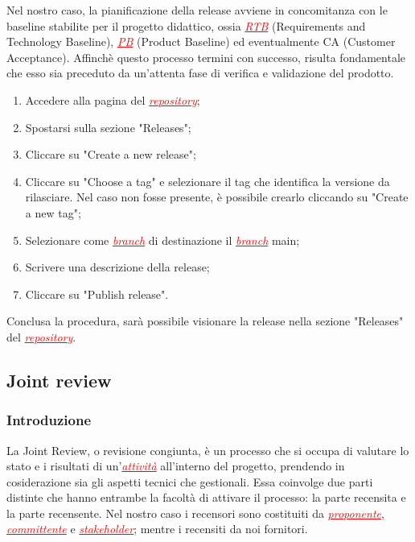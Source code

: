 Nel nostro caso, la pianificazione della release avviene in concomitanza con le baseline stabilite per il progetto didattico, ossia 
\textcolor{red}{\uline{\textit{RTB}}} (Requirements and Technology Baseline), 
\textcolor{red}{\uline{\textit{PB}}} (Product Baseline) ed eventualmente CA (Customer Acceptance).
Affinchè questo processo termini con successo, risulta fondamentale che esso sia preceduto da un'attenta fase di verifica e validazione del prodotto.

\begin{enumerate}
    \item Accedere alla pagina del \textcolor{red}{\uline{\textit{repository}}};
    \item Spostarsi sulla sezione "Releases";
    \item Cliccare su "Create a new release";
    \item Cliccare su "Choose a tag" e selezionare il tag che identifica la versione da rilasciare. Nel caso non fosse presente, è possibile
    crearlo cliccando su "Create a new tag";
    \item Selezionare come \textcolor{red}{\uline{\textit{branch}}} di destinazione il \textcolor{red}{\uline{\textit{branch}}} main;
    \item Scrivere una descrizione della release;
    \item Cliccare su "Publish release".
\end{enumerate}
Conclusa la procedura, sarà possibile visionare la release nella sezione "Releases" del \textcolor{red}{\uline{\textit{repository}}}.

\subsection{Joint review}
\subsubsection{Introduzione}
La Joint Review, o revisione congiunta, è un processo che si occupa di valutare lo stato e i risultati di un'\textcolor{red}{\uline{\textit{attività}}}
all'interno del progetto, prendendo in cosiderazione sia gli aspetti tecnici che gestionali. Essa coinvolge due parti distinte che hanno entrambe
la facoltà di attivare il processo: la parte recensita e la parte recensente. Nel nostro caso i recensori sono costituiti da
\textcolor{red}{\uline{\textit{proponente}}}, \textcolor{red}{\uline{\textit{committente}}} e \textcolor{red}{\uline{\textit{stakeholder}}};
mentre i recensiti da noi fornitori.

